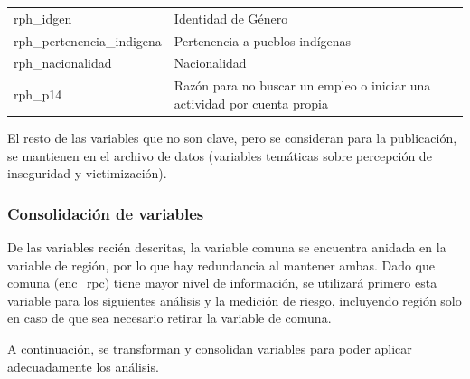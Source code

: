 \documentclass[]{book}
\theoremstyle{definition}
\theoremstyle{definition}
\theoremstyle{definition}
\theoremstyle{definition}
\theoremstyle{remark}
\begin{document}
\begin{longtable}[]{@{}ll@{}}
\begin{minipage}[t]{0.47\columnwidth}
rph\_idgen\strut
\end{minipage} & \begin{minipage}[t]{0.47\columnwidth}\raggedright
Identidad de Género\strut
\end{minipage}\tabularnewline
\begin{minipage}[t]{0.47\columnwidth}\raggedright
rph\_pertenencia\_indigena\strut
\end{minipage} & \begin{minipage}[t]{0.47\columnwidth}\raggedright
Pertenencia a pueblos indígenas\strut
\end{minipage}\tabularnewline
\begin{minipage}[t]{0.47\columnwidth}\raggedright
rph\_nacionalidad\strut
\end{minipage} & \begin{minipage}[t]{0.47\columnwidth}\raggedright
Nacionalidad\strut
\end{minipage}\tabularnewline
\begin{minipage}[t]{0.47\columnwidth}\raggedright
rph\_p14\strut
\end{minipage} & \begin{minipage}[t]{0.47\columnwidth}\raggedright
Razón para no buscar un empleo o iniciar una actividad por cuenta propia\strut
\end{minipage}\tabularnewline
\bottomrule
\end{longtable}

El resto de las variables que no son clave, pero se consideran para la publicación, se mantienen en el archivo de datos (variables temáticas sobre percepción de inseguridad y victimización).

\hypertarget{consolidaciuxf3n-de-variables}{%
\subsubsection{Consolidación de variables}\label{consolidaciuxf3n-de-variables}}

De las variables recién descritas, la variable comuna se encuentra anidada en la variable de región, por lo que hay redundancia al mantener ambas. Dado que comuna (enc\_rpc) tiene mayor nivel de información, se utilizará primero esta variable para los siguientes análisis y la medición de riesgo, incluyendo región solo en caso de que sea necesario retirar la variable de comuna.

A continuación, se transforman y consolidan variables para poder aplicar adecuadamente los análisis.
\end{document}
